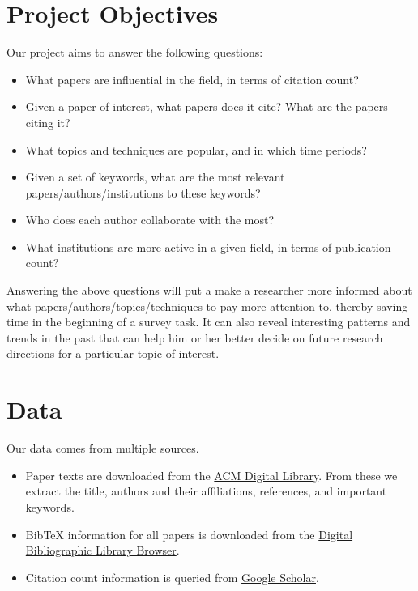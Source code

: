\documentclass[dvips,12pt]{article}
\begin{document}
\section{Project Objectives}
Our project aims to answer the following questions:
\begin{itemize}
    \item What papers are influential in the field, in terms of citation count?
    \item Given a paper of interest, what papers does it cite? What are the papers citing it?
    \item What topics and techniques are popular, and in which time periods?
    \item Given a set of keywords, what are the most relevant papers/authors/institutions to these keywords?
    \item Who does each author collaborate with the most?
    \item What institutions are more active in a given field, in terms of publication count?    
\end{itemize}
Answering the above questions will put a make a researcher more informed about what papers/authors/topics/techniques to pay more attention to, thereby saving time in the beginning of a survey task. It can also reveal interesting patterns and trends in the past that can help him or her better decide on future research directions for a particular topic of interest.

\section{Data}
Our data comes from multiple sources.
\begin{itemize}
    \item Paper texts are downloaded from the \href{http://dl.acm.org/}{ACM Digital Library}. From these we extract the title, authors and their affiliations, references, and important keywords.
    \item BibTeX information for all papers is downloaded from  the \href{http://dblp.uni-trier.de/db/}{Digital Bibliographic Library Browser}.
    \item Citation count information is queried from \href{https://scholar.google.com/}{Google Scholar}.
\end{itemize}
\end{document}
